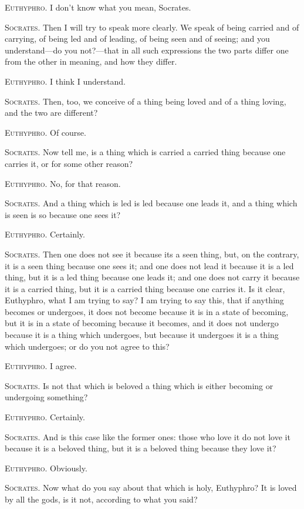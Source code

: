 \textsc{Euthyphro}. I don't know what you mean, Socrates.

\textsc{Socrates}. Then I will try to speak more clearly. We speak of
being carried and of carrying, of being led and of leading, of being
seen and of seeing; and you understand---do you not?---that in all
such expressions the two parts differ one from the other in meaning,
and how they differ.

\textsc{Euthyphro}. I think I understand.

\textsc{Socrates}. Then, too, we conceive of a thing being
loved and of a thing loving, and the two are different?

\textsc{Euthyphro}. Of course.

\textsc{Socrates}. Now tell me, is a thing which is carried a carried
thing because one carries it, or for some other reason?

\textsc{Euthyphro}. No, for that reason.

\textsc{Socrates}. And a thing which is led is led because one leads
it, and a thing which is seen is so because one sees it?

\textsc{Euthyphro}. Certainly.

\textsc{Socrates}. Then one does not see it because its a seen thing,
but, on the contrary, it is a seen thing because one sees it; and one
does not lead it because it is a led thing, but it is a led thing
because one leads it; and one does not carry it because it is a
carried thing, but it is a carried thing because one carries it. Is it
clear, Euthyphro, what I am trying to say? I am trying to say this,
that if anything becomes or undergoes, it does not become because it
is in a state of becoming, but it is in a state of becoming because it
becomes, and it does not undergo because it is a thing which
undergoes, but because it undergoes it is a thing which undergoes; or
do you not agree to this?

\textsc{Euthyphro}. I agree.

\textsc{Socrates}. Is not that which is beloved a thing which is
either becoming or undergoing something?

\textsc{Euthyphro}. Certainly.

\textsc{Socrates}. And is this case like the former ones: those who
love it do not love it because it is a beloved thing, but it is a
beloved thing because they love it?

\textsc{Euthyphro}. Obviously.

\textsc{Socrates}. Now what do you say about that which is
holy, Euthyphro? It is loved by all the gods, is it not, according to
what you said?

